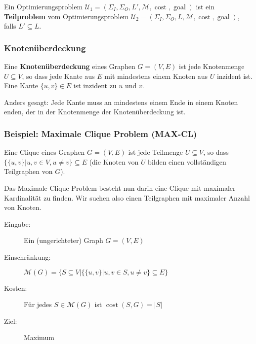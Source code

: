 \begin{definition}
Ein Optimierungsproblem $\mathcal{U}_1 = (\Sigma_I, \Sigma_O, L', \mathcal{M}, \operatorname{cost}, \operatorname{goal})$ ist ein \textbf{Teilproblem} vom Optimierungsproblem $\mathcal{U}_2 = (\Sigma_I, \Sigma_O, L, \mathcal{M}, \operatorname{cost}, \operatorname{goal})$, falls $L' \subseteq L$.
\end{definition}

\subsubsection{Knotenüberdeckung}
\label{sec:knotenueberdeckung}
\begin{definition}
Eine \textbf{Knotenüberdeckung} eines Graphen $G = (V, E)$ ist jede Knotenmenge $U \subseteq V$, so dass jede Kante aus $E$ mit mindestens einem Knoten aus $U$ inzident ist. Eine Kante $\{u, v\} \in E$ ist inzident zu $u$ und $v$.

Anders gesagt: Jede Kante muss an mindestens einem Ende in einem Knoten enden, der in der Knotenmenge der Knotenüberdeckung ist.
\end{definition}

\subsubsection{Beispiel: Maximale Clique Problem (MAX-CL)}
\begin{definition}
Eine Clique eines Graphen $G = (V, E)$ ist jede Teilmenge $U \subseteq V$, so dass $\{\{u, v\} | u, v \in V, u \not= v\} \subseteq E$ (die Knoten von $U$ bilden einen vollständigen Teilgraphen von $G$).
\end{definition}

Das Maximale Clique Problem besteht nun darin eine Clique mit maximaler Kardinalität zu finden. Wir suchen also einen Teilgraphen mit maximaler Anzahl von Knoten.

\begin{description}
  \item[Eingabe:] Ein (ungerichteter) Graph $G = (V, E)$
  \item[Einschränkung:] $\mathcal{M}(G) = \{S \subseteq V | \{\{u, v\} | u, v \in S, u \not= v\} \subseteq E\}$
  \item[Kosten:] Für jedes $S \in \mathcal{M}(G)$ ist $\operatorname{cost}(S, G) = |S|$
  \item[Ziel:] Maximum
\end{description}

